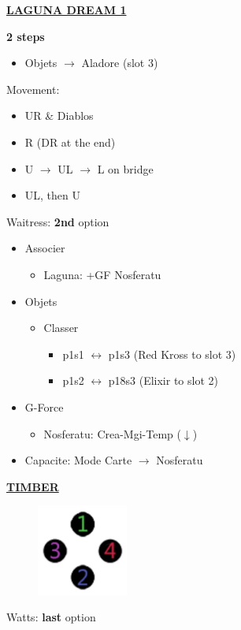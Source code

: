\underline{\textbf{LAGUNA DREAM 1}}

\textbf{2 steps}

\begin{menu}
	\begin{itemize}
		\item Objets $\rightarrow$ Aladore (slot 3)
	\end{itemize}
\end{menu}

Movement:
\begin{itemize}
	\item UR \& Diablos
	\item R (DR at the end)
	\item U $\rightarrow$ UL $\rightarrow$ L on bridge
	\item UL, then U
\end{itemize}

Waitress: \textbf{2nd} option

\begin{menu}[18s]
	\begin{itemize}
		\item Associer
			\begin{itemize}
				\item Laguna: +GF Nosferatu
			\end{itemize}
		\item Objets
			\begin{itemize}
				\item Classer
					\begin{itemize}
						\item p1s1 $\leftrightarrow$ p1s3 (Red Kross to slot 3)
						\item p1s2 $\leftrightarrow$ p18s3 (Elixir to slot 2)
					\end{itemize}
			\end{itemize}
		\item G-Force
			\begin{itemize}
				\item Nosferatu: Crea-Mgi-Temp ($\downarrow$)
			\end{itemize}
		\item Capacite: Mode Carte $\rightarrow$ Nosferatu
	\end{itemize}
\end{menu}

\underline{\textbf{TIMBER}}

\begin{figure}
\includegraphics[width=3cm]{Images/train_codes.png}
\end{figure}
Watts: \textbf{last} option

